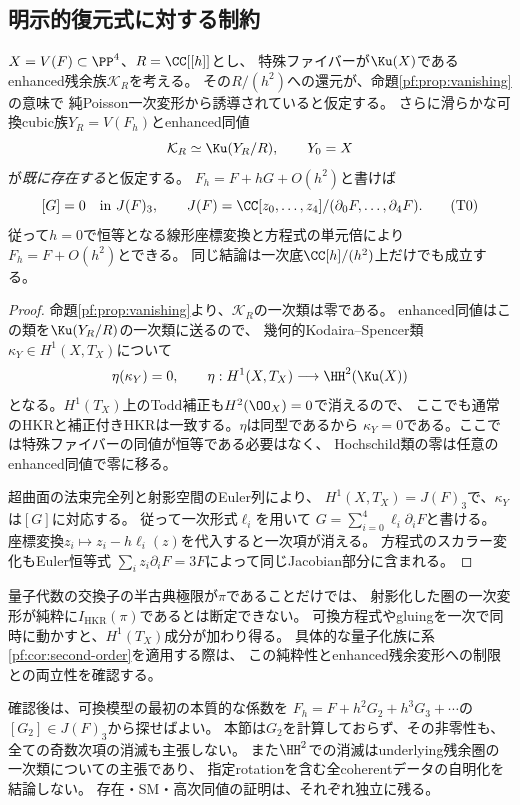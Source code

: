 \subsection{明示的復元式に対する制約}
\begin{corollary}[可換復元先の方程式は一次で動かない]
\label{pf:cor:second-order}
$X=V(F)\subset\PP^4$、$R=\CC[[h]]$とし、
特殊ファイバーが$\Ku(X)$であるenhanced残余族$\mathcal K_R$を考える。
その$R/(h^2)$への還元が、命題\ref{pf:prop:vanishing}の意味で
純Poisson一次変形から誘導されていると仮定する。
さらに滑らかな可換cubic族$Y_R=V(F_h)$とenhanced同値
\[
 \mathcal K_R\simeq\Ku(Y_R/R),\qquad Y_0=X
\]
が\emph{既に存在する}と仮定する。
$F_h=F+hG+O(h^2)$と書けば
\[
 [G]=0\quad\text{in }
 J(F)_3,
 \qquad J(F)=\CC[z_0,\ldots,z_4]/(\partial_0F,\ldots,\partial_4F).
 \tag{T0}\label{pf:eq:tangent-zero}
\]
従って$h=0$で恒等となる線形座標変換と方程式の単元倍により
$F_h=F+O(h^2)$とできる。
同じ結論は一次底$\CC[h]/(h^2)$上だけでも成立する。
\end{corollary}
\begin{proof}
命題\ref{pf:prop:vanishing}より、$\mathcal K_R$の一次類は零である。
enhanced同値はこの類を$\Ku(Y_R/R)$の一次類に送るので、
幾何的Kodaira--Spencer類$\kappa_Y\in H^1(X,T_X)$について
\[
 \eta(\kappa_Y)=0,\qquad
 \eta:H^1(X,T_X)\longrightarrow\HH^2(\Ku(X))
\]
となる。$H^1(T_X)$上のTodd補正も$H^2(\OO_X)=0$で消えるので、
ここでも通常のHKRと補正付きHKRは一致する。$\eta$は同型\cite[Theorem 4.4(2)]{JLLZER}であるから
$\kappa_Y=0$である。ここでは特殊ファイバーの同値が恒等である必要はなく、
Hochschild類の零は任意のenhanced同値で零に移る。

超曲面の法束完全列と射影空間のEuler列により、
$H^1(X,T_X)=J(F)_3$で、$\kappa_Y$は$[G]$に対応する。
従って一次形式$\ell_i$を用いて
$G=\sum_{i=0}^4\ell_i\partial_iF$と書ける。
座標変換$z_i\mapsto z_i-h\ell_i(z)$を代入すると一次項が消える。
方程式のスカラー変化もEuler恒等式
$\sum_i z_i\partial_iF=3F$によって同じJacobian部分に含まれる。
\end{proof}

\begin{remark}[一次消滅の適用条件と高次項]
\label{pf:rem:scope}
量子代数の交換子の半古典極限が$\pi$であることだけでは、
射影化した圏の一次変形が純粋に$I_{\mathrm{HKR}}(\pi)$であるとは断定できない。
可換方程式やgluingを一次で同時に動かすと、$H^1(T_X)$成分が加わり得る。
具体的な量子化族に系\ref{pf:cor:second-order}を適用する際は、
この純粋性とenhanced残余変形への制限との両立性を確認する。

確認後は、可換模型の最初の本質的な係数を
$F_h=F+h^2G_2+h^3G_3+\cdots$の$[G_2]\in J(F)_3$から探せばよい。
本節は$G_2$を計算しておらず、その非零性も、全ての奇数次項の消滅も主張しない。
また$\HH^2$での消滅はunderlying残余圏の一次類についての主張であり、
指定rotationを含む全coherentデータの自明化を結論しない。
存在・SM・高次同値の証明は、それぞれ独立に残る。
\end{remark}